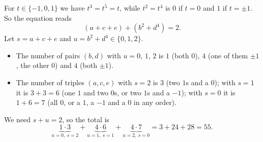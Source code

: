 For $t\in\{-1,0,1\}$ we have $t^3=t^5=t$, while $t^2=t^4$ is $0$ if $t=0$ and $1$ if $t=\pm1$. So the equation reads
\[(a+c+e)+\left(b^2+d^4\right)=2.\]
Let $s=a+c+e$ and $u=b^2+d^4\in\{0,1,2\}$.
\begin{itemize}
\item The number of pairs $(b,d)$ with $u=0$, $1$, $2$ is $1$ (both $0$), $4$ (one of them $\pm1$, the other $0$) and $4$ (both $\pm1$).
\item The number of triples $(a,c,e)$ with $s=2$ is $3$ (two $1$s and a $0$); with $s=1$ it is $3+3=6$ (one $1$ and two $0$s, or two $1$s and a $-1$); with $s=0$ it is $1+6=7$ (all $0$, or a $1$, a $-1$ and a $0$ in any order).
\end{itemize}
We need $s+u=2$, so the total is
\[\underbrace{1\cdot3}_{u=0,\ s=2}+\underbrace{4\cdot6}_{u=1,\ s=1}+\underbrace{4\cdot7}_{u=2,\ s=0}=3+24+28=\boxed{55}.\]
